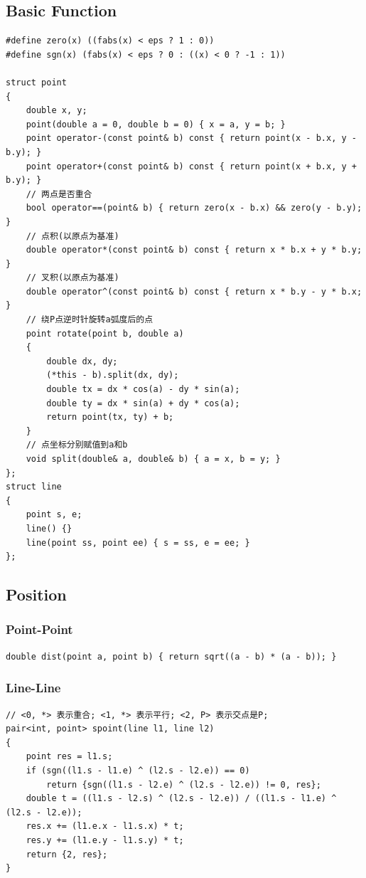 \documentclass[twoside]{article}
\begin{document}
\subsection{Basic Function}
\begin{lstlisting}
#define zero(x) ((fabs(x) < eps ? 1 : 0))
#define sgn(x) (fabs(x) < eps ? 0 : ((x) < 0 ? -1 : 1))

struct point
{
    double x, y;
    point(double a = 0, double b = 0) { x = a, y = b; }
    point operator-(const point& b) const { return point(x - b.x, y - b.y); }
    point operator+(const point& b) const { return point(x + b.x, y + b.y); }
    // 两点是否重合
    bool operator==(point& b) { return zero(x - b.x) && zero(y - b.y); }
    // 点积(以原点为基准)
    double operator*(const point& b) const { return x * b.x + y * b.y; }
    // 叉积(以原点为基准)
    double operator^(const point& b) const { return x * b.y - y * b.x; }
    // 绕P点逆时针旋转a弧度后的点
    point rotate(point b, double a)
    {
        double dx, dy;
        (*this - b).split(dx, dy);
        double tx = dx * cos(a) - dy * sin(a);
        double ty = dx * sin(a) + dy * cos(a);
        return point(tx, ty) + b;
    }
    // 点坐标分别赋值到a和b
    void split(double& a, double& b) { a = x, b = y; }
};
struct line
{
    point s, e;
    line() {}
    line(point ss, point ee) { s = ss, e = ee; }
};
\end{lstlisting}
\subsection{Position}
\subsubsection{Point-Point}
\begin{lstlisting}
double dist(point a, point b) { return sqrt((a - b) * (a - b)); }
\end{lstlisting}
\subsubsection{Line-Line}
\begin{lstlisting}
// <0, *> 表示重合; <1, *> 表示平行; <2, P> 表示交点是P;
pair<int, point> spoint(line l1, line l2)
{
    point res = l1.s;
    if (sgn((l1.s - l1.e) ^ (l2.s - l2.e)) == 0)
        return {sgn((l1.s - l2.e) ^ (l2.s - l2.e)) != 0, res};
    double t = ((l1.s - l2.s) ^ (l2.s - l2.e)) / ((l1.s - l1.e) ^ (l2.s - l2.e));
    res.x += (l1.e.x - l1.s.x) * t;
    res.y += (l1.e.y - l1.s.y) * t;
    return {2, res};
}
\end{lstlisting}
\end{document}
